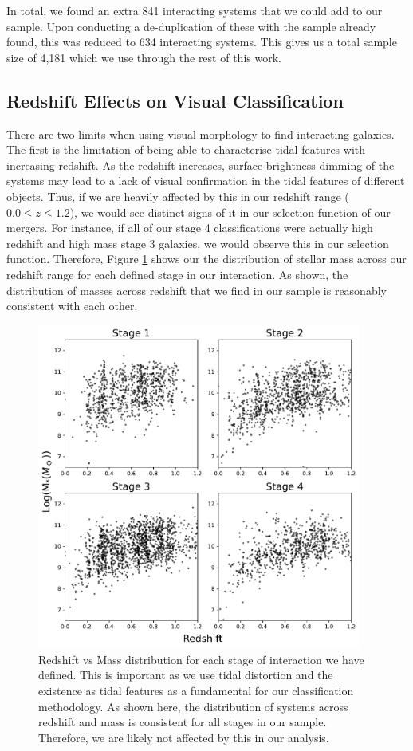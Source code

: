 In total, we found an extra 841 interacting systems that we could add to our sample. Upon conducting a de-duplication of these with the sample already found, this was reduced to 634 interacting systems. This gives us a total sample size of 4,181 which we use through the rest of this work.

\subsection{Redshift Effects on Visual Classification}
\noindent There are two limits when using visual morphology to find interacting galaxies. The first is the limitation of being able to characterise tidal features with increasing redshift. As the redshift increases, surface brightness dimming of the systems may lead to a lack of visual confirmation in the tidal features of different objects. Thus, if we are heavily affected by this in our redshift range ($0.0 \leq z \leq 1.2$), we would see distinct signs of it in our selection function of our mergers. For instance, if all of our stage 4 classifications were actually high redshift and high mass stage 3 galaxies, we would observe this in our selection function. Therefore, Figure \ref{fig:redshift_selection} shows our the distribution of stellar mass across our redshift range for each defined stage in our interaction. As shown, the distribution of masses across redshift that we find in our sample is reasonably consistent with each other.

\begin{figure}
    \centering
    \includegraphics[width=0.95\textwidth]{Chapter3/figures/stage-selection.pdf}
    \caption{Redshift vs Mass distribution for each stage of interaction we have defined. This is important as we use tidal distortion and the existence as tidal features as a fundamental for our classification methodology. As shown here, the distribution of systems across redshift and mass is consistent for all stages in our sample. Therefore, we are likely not affected by this in our analysis.}
    \label{fig:redshift_selection}
\end{figure}

